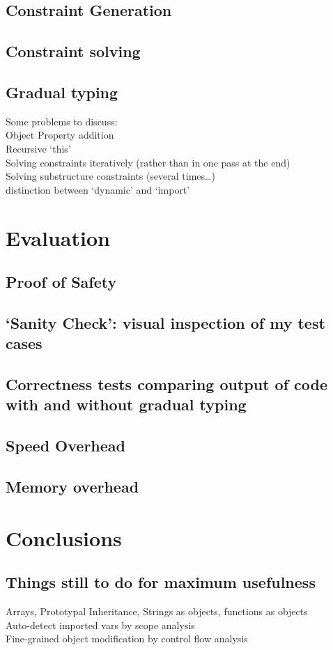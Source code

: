 \documentclass{article}
\begin{document}
		\subsection{Constraint Generation}
		\subsection{Constraint solving}
		\subsection{Gradual typing}
		Some problems to discuss: \\
			Object Property addition \\
			Recursive `this' \\
			Solving constraints iteratively (rather than in one pass at the end) \\
			Solving substructure constraints (several times\ldots) \\
			distinction between `dynamic' and `import' \\
	\section{Evaluation}\label{evaluation}
		\subsection{Proof of Safety}
		\subsection{`Sanity Check': visual inspection of my test cases}
		\subsection{Correctness tests comparing output of code with and without gradual typing}
		\subsection{Speed Overhead}
		\subsection{Memory overhead}
	\section{Conclusions}
		\subsection{Things still to do for maximum usefulness}
			Arrays, Prototypal Inheritance, Strings as objects, functions as objects \\
			Auto-detect imported vars by scope analysis \\
			Fine-grained object modification by control flow analysis
\end{document}
